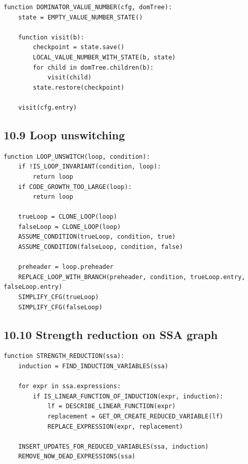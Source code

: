 \documentclass[10pt,letterpaper]{article}
\begin{document}
\begin{verbatim}
function DOMINATOR_VALUE_NUMBER(cfg, domTree):
    state = EMPTY_VALUE_NUMBER_STATE()

    function visit(b):
        checkpoint = state.save()
        LOCAL_VALUE_NUMBER_WITH_STATE(b, state)
        for child in domTree.children(b):
            visit(child)
        state.restore(checkpoint)

    visit(cfg.entry)
\end{verbatim}

\subsection*{10.9 Loop unswitching}

\begin{verbatim}
function LOOP_UNSWITCH(loop, condition):
    if !IS_LOOP_INVARIANT(condition, loop):
        return loop
    if CODE_GROWTH_TOO_LARGE(loop):
        return loop

    trueLoop = CLONE_LOOP(loop)
    falseLoop = CLONE_LOOP(loop)
    ASSUME_CONDITION(trueLoop, condition, true)
    ASSUME_CONDITION(falseLoop, condition, false)

    preheader = loop.preheader
    REPLACE_LOOP_WITH_BRANCH(preheader, condition, trueLoop.entry, falseLoop.entry)
    SIMPLIFY_CFG(trueLoop)
    SIMPLIFY_CFG(falseLoop)
\end{verbatim}

\subsection*{10.10 Strength reduction on SSA graph}

\begin{verbatim}
function STRENGTH_REDUCTION(ssa):
    induction = FIND_INDUCTION_VARIABLES(ssa)

    for expr in ssa.expressions:
        if IS_LINEAR_FUNCTION_OF_INDUCTION(expr, induction):
            lf = DESCRIBE_LINEAR_FUNCTION(expr)
            replacement = GET_OR_CREATE_REDUCED_VARIABLE(lf)
            REPLACE_EXPRESSION(expr, replacement)

    INSERT_UPDATES_FOR_REDUCED_VARIABLES(ssa, induction)
    REMOVE_NOW_DEAD_EXPRESSIONS(ssa)
\end{verbatim}
\end{document}
